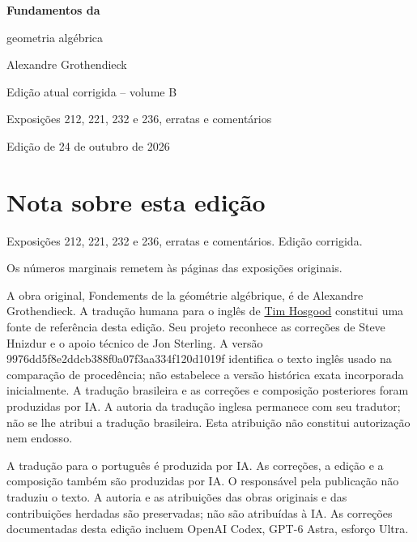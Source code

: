 \documentclass[11pt,twoside,openany]{book}
\numberwithin{equation}{section}
\theoremstyle{plain}
\theoremstyle{definition}
\theoremstyle{remark}
\begin{document}
\frontmatter
\begin{titlepage}
\centering
\vspace*{0.13\textheight}
{\Huge\bfseries Fundamentos da\par geometria algébrica\par}
\vspace{1.5\baselineskip}
{\Large Alexandre Grothendieck\par}
\vfill
{\Large Edição atual corrigida -- volume B\par}
\vspace{\baselineskip}
{\large Exposições 212, 221, 232 e 236, erratas e comentários\par}
\vspace{1.5\baselineskip}
{\normalsize Edição de 24 de outubro de 2026\par}
\end{titlepage}
\chapter*{Nota sobre esta edição}
Exposições 212, 221, 232 e 236, erratas e comentários. Edição corrigida.

Os números marginais remetem às páginas das exposições originais.

A obra original, Fondements de la géométrie algébrique, é de Alexandre Grothendieck. A tradução humana para o inglês de \href{https://github.com/thosgood/fga/tree/9976dd5f8e2ddcb388f0a07f3aa334f120d1019f}{Tim Hosgood} constitui uma fonte de referência desta edição. Seu projeto reconhece as correções de Steve Hnizdur e o apoio técnico de Jon Sterling. A versão 9976dd5f8e2ddcb388f0a07f3aa334f120d1019f identifica o texto inglês usado na comparação de procedência; não estabelece a versão histórica exata incorporada inicialmente. A tradução brasileira e as correções e composição posteriores foram produzidas por IA. A autoria da tradução inglesa permanece com seu tradutor; não se lhe atribui a tradução brasileira. Esta atribuição não constitui autorização nem endosso.

A tradução para o português é produzida por IA. As correções, a edição e a composição também são produzidas por IA. O responsável pela publicação não traduziu o texto. A autoria e as atribuições das obras originais e das contribuições herdadas são preservadas; não são atribuídas à IA. As correções documentadas desta edição incluem OpenAI Codex, GPT-6 Astra, esforço Ultra.
\end{document}

